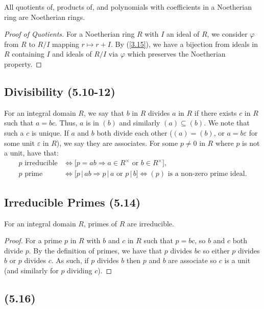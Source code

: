 All quotients of, products of, and polynomials with coefficients
in a Noetherian ring are Noetherian rings.

\begin{proof}[Proof of Quotients]
    For a Noetherian ring $R$ with $I$ an ideal of $R$, we consider
    $\varphi$ from $R$ to $R / I$ mapping $r \mapsto r + I$.
    By (\ref{3.15}), we have a bijection from ideals
    in $R$ containing $I$ and ideals of $R / I$ via $\varphi$
    which preserves the Noetherian property.
\end{proof}

\subsection{Divisibility (5.10-12)} \label{5.10} \label{5.11} \label{5.12}

For an integral domain $R$, we say that $b$ in $R$ divides $a$ in $R$
if there exists $c$ in $R$ such that $a = bc$. Thus, $a$ is in $(b)$
and similarly $(a) \subseteq (b)$. We note that such a $c$ is unique.
\bs
If $a$ and $b$ both divide each other ($(a) = (b)$, or $a = b\varepsilon$
for some unit $\varepsilon$ in $R$), we say they are associates.
For some $p \neq 0$ in $R$ where $p$ is not a unit, have that: \begin{align*}
    p \text{ irreducible} &\Longleftrightarrow 
    \bigl[p = ab \Longrightarrow a \in R^\times \text{ or } b \in R^\times
    \bigr], \\
    p \text{ prime} &\Longleftrightarrow 
    \bigl[p \, | \, ab \Longrightarrow p \, | \, a \text{ or } p \, | \, b
    \bigr]
    \Longleftrightarrow (p) \text{ is a non-zero prime ideal}.
\end{align*}

\subsection{Irreducible Primes (5.14)} \label{5.14}

For an integral domain $R$, primes of $R$ are irreducible.

\begin{proof}
    For a prime $p$ in $R$ with $b$ and $c$ in $R$ such that $p = bc$,
    so $b$ and $c$ both divide $p$. By the definition of primes, we have 
    that $p$ divides $bc$ so either $p$ divides $b$ or $p$ divides
    $c$. As such, if $p$ divides $b$ then $p$ and $b$ are associate
    so $c$ is a unit (and similarly for $p$ dividing $c$).
\end{proof}

\subsection{ (5.16)} \label{5.16} 
